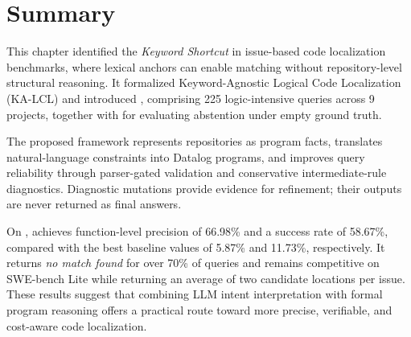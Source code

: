 \section{Summary}\label{sec:summary-dataloc}
This chapter identified the \textit{Keyword Shortcut} in issue-based code localization benchmarks, where lexical anchors can enable matching without repository-level structural reasoning. It formalized Keyword-Agnostic Logical Code Localization (KA-LCL) and introduced \dataset, comprising 225 logic-intensive queries across 9 projects, together with \negset for evaluating abstention under empty ground truth.

The proposed \tooldataloc framework represents repositories as program facts, translates natural-language constraints into Datalog programs, and improves query reliability through parser-gated validation and conservative intermediate-rule diagnostics. Diagnostic mutations provide evidence for refinement; their outputs are never returned as final answers.

On \dataset, \tooldataloc achieves function-level precision of 66.98\% and a success rate of 58.67\%, compared with the best baseline values of 5.87\% and 11.73\%, respectively. It returns \textit{no match found} for over 70\% of \negset queries and remains competitive on SWE-bench Lite while returning an average of two candidate locations per issue. These results suggest that combining LLM intent interpretation with formal program reasoning offers a practical route toward more precise, verifiable, and cost-aware code localization.
